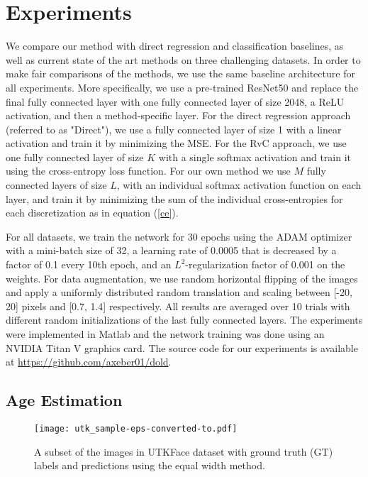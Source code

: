 \documentclass[10pt, conference, a4paper]{IEEEtran}
\begin{document}
\section{Experiments}
We compare our method with direct regression and classification baselines, as well as current state of the art methods on three challenging datasets. In order to make fair comparisons of the methods, we use the same baseline architecture for all experiments. More specifically, we use a pre-trained ResNet50 \cite{he2016deep} and replace the final fully connected layer with one fully connected layer of size 2048, a ReLU activation, and then a method-specific layer. For the direct regression approach (referred to as "Direct"), we use a fully connected layer of size 1 with a linear activation and train it by minimizing the MSE. For the RvC approach, we use one fully connected layer of size $K$ with a single softmax activation and train it using the cross-entropy loss function. For our own method we use $M$ fully connected layers of size $L$, with an individual softmax activation function on each layer, and train it by minimizing the sum of the individual cross-entropies for each discretization as in equation (\ref{ce}).

For all datasets, we train the network for 30 epochs using the ADAM optimizer \cite{kingma2014adam} with a mini-batch size of 32, a learning rate of 0.0005 that is decreased by a factor of 0.1 every 10th epoch, and an $L^2$-regularization factor of 0.001 on the weights. For data augmentation, we use random horizontal flipping of the images and apply a uniformly distributed random translation and scaling between [-20, 20] pixels and [0.7, 1.4] respectively. All results are averaged over 10 trials with different random initializations of the last fully connected layers. The experiments were implemented in Matlab and the network training was done using an NVIDIA Titan V graphics card. The source code for our experiments is available at \url{https://github.com/axeber01/dold}.

\subsection{Age Estimation}

\begin{figure}[t]
  \centering
  \texttt{[image: utk\_sample-eps-converted-to.pdf]}
  \caption{A subset of the images in UTKFace dataset \cite{zhifei2017cvpr} with ground truth (GT) labels and predictions using the equal width method.}
\label{utk_preview}
\end{figure}
\end{document}
